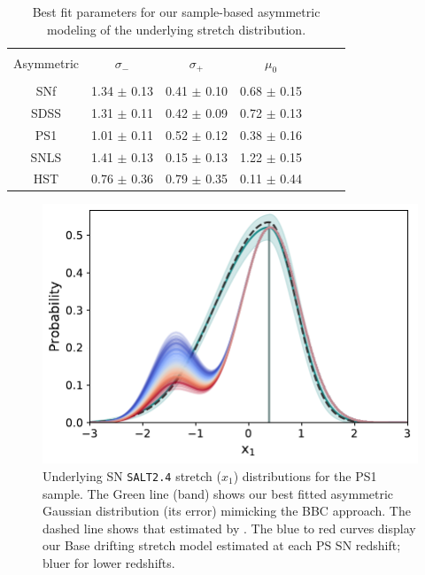 \documentclass[]{aa} %
\begin{document}
\begin{table}
    \centering
    \caption{Best fit parameters for our sample-based asymmetric modeling of the
    underlying stretch distribution.}
    \label{tab:bbc}
    \begin{tabular}{c c c c c c c}\hline\hline\\[-0.8em]
    Asymmetric & $\sigma_{-}$ & $\sigma_{+}$ & $\mu_0$ \\\hline\\[-0.8em]
    SNf &  1.34 $\pm$ 0.13 & 0.41 $\pm$ 0.10 & 0.68 $\pm$ 0.15\\[0.15em]
    SDSS & 1.31 $\pm$ 0.11 & 0.42 $\pm$ 0.09 & 0.72 $\pm$ 0.13 \\[0.15em]
    PS1 &  1.01 $\pm$ 0.11 & 0.52 $\pm$ 0.12 & 0.38 $\pm$ 0.16 \\[0.15em]
    SNLS & 1.41 $\pm$ 0.13 & 0.15 $\pm$ 0.13 & 1.22 $\pm$ 0.15 \\[0.15em]
    HST &  0.76 $\pm$ 0.36 & 0.79 $\pm$ 0.35 & 0.11 $\pm$ 0.44 \\\hline\hline
    \end{tabular}
\end{table}

\begin{figure}
    \centering
    \includegraphics[width=\linewidth]{Article_figures/bbc_comp_PS1.pdf}
    \caption{Underlying SN \textsc{\texttt{SALT2.4}} stretch ($x_1$)
        distributions for the PS1 sample. The Green line (band) shows our best
        fitted asymmetric Gaussian distribution (its error) mimicking the BBC
        approach. The dashed line shows that estimated by
    \cite{scolnic2018a}. The blue to red curves display our Base drifting
stretch model estimated at each PS SN redshift; bluer for lower redshifts.}
    \label{fig:bbc_pdf_ps1}
\end{figure}
\end{document}
